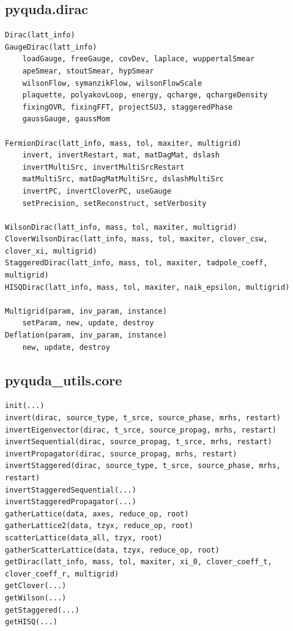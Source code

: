\documentclass[12pt,a4paper]{ctexart}
\begin{document}
\subsection{pyquda.dirac}

\begin{lstlisting}[style=pycode]
Dirac(latt_info)
GaugeDirac(latt_info)
    loadGauge, freeGauge, covDev, laplace, wuppertalSmear
    apeSmear, stoutSmear, hypSmear
    wilsonFlow, symanzikFlow, wilsonFlowScale
    plaquette, polyakovLoop, energy, qcharge, qchargeDensity
    fixingOVR, fixingFFT, projectSU3, staggeredPhase
    gaussGauge, gaussMom

FermionDirac(latt_info, mass, tol, maxiter, multigrid)
    invert, invertRestart, mat, matDagMat, dslash
    invertMultiSrc, invertMultiSrcRestart
    matMultiSrc, matDagMatMultiSrc, dslashMultiSrc
    invertPC, invertCloverPC, useGauge
    setPrecision, setReconstruct, setVerbosity

WilsonDirac(latt_info, mass, tol, maxiter, multigrid)
CloverWilsonDirac(latt_info, mass, tol, maxiter, clover_csw, clover_xi, multigrid)
StaggeredDirac(latt_info, mass, tol, maxiter, tadpole_coeff, multigrid)
HISQDirac(latt_info, mass, tol, maxiter, naik_epsilon, multigrid)

Multigrid(param, inv_param, instance)
    setParam, new, update, destroy
Deflation(param, inv_param, instance)
    new, update, destroy
\end{lstlisting}

\subsection{pyquda\_utils.core}

\begin{lstlisting}[style=pycode]
init(...)
invert(dirac, source_type, t_srce, source_phase, mrhs, restart)
invertEigenvector(dirac, t_srce, source_propag, mrhs, restart)
invertSequential(dirac, source_propag, t_srce, mrhs, restart)
invertPropagator(dirac, source_propag, mrhs, restart)
invertStaggered(dirac, source_type, t_srce, source_phase, mrhs, restart)
invertStaggeredSequential(...)
invertStaggeredPropagator(...)
gatherLattice(data, axes, reduce_op, root)
gatherLattice2(data, tzyx, reduce_op, root)
scatterLattice(data_all, tzyx, root)
gatherScatterLattice(data, tzyx, reduce_op, root)
getDirac(latt_info, mass, tol, maxiter, xi_0, clover_coeff_t, clover_coeff_r, multigrid)
getClover(...)
getWilson(...)
getStaggered(...)
getHISQ(...)
\end{lstlisting}
\end{document}
